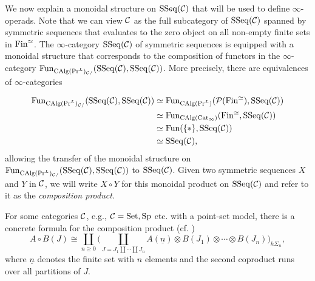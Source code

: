 %



We now explain a monoidal structure on $\operatorname{SSeq}({\mathcal{C}})$ that will be used to define $\infty$-operads. Note that we can view ${\mathcal{C}}$ as the full subcategory of $\operatorname{SSeq}({\mathcal{C}})$ spanned by symmetric sequences that evaluates to the zero object on all non-empty finite sets in $\operatorname{Fin}^{\simeq}$. 
The $\infty$-category $\operatorname{SSeq}({\mathcal{C}})$ of symmetric sequences is equipped with a monoidal structure that corresponds to the composition of functors in the $\infty$-category $\operatorname{Fun}_{\operatorname{CAlg}(\Pr^L)_{{\mathcal{C}}/}}(\operatorname{SSeq}({\mathcal{C}}),\operatorname{SSeq}({\mathcal{C}}))$. More precisely, there are equivalences of $\infty$-categories

\begin{align*}
    	\operatorname{Fun}_{\operatorname{CAlg}(\Pr^L)_{{\mathcal{C}}/}}(\operatorname{SSeq}({\mathcal{C}}),\operatorname{SSeq}({\mathcal{C}}))
	& \simeq 
\operatorname{Fun}_{\operatorname{CAlg}(\Pr^L)}({\mathcal{P}}(\operatorname{Fin}^{\simeq}),\operatorname{SSeq}({\mathcal{C}}))\\
& \simeq
\operatorname{Fun}_{\operatorname{CAlg}(\operatorname{Cat}_{\infty})}(\operatorname{Fin}^{\simeq},\operatorname{SSeq}({\mathcal{C}}))\\
& \simeq \operatorname{Fun}(\{*\}, \operatorname{SSeq}({\mathcal{C}}))\\
& \simeq \operatorname{SSeq}({\mathcal{C}}),
\end{align*}
allowing the transfer of the monoidal structure on $\operatorname{Fun}_{\operatorname{CAlg}(\Pr^L)_{{\mathcal{C}}/}}(\operatorname{SSeq}({\mathcal{C}}),\operatorname{SSeq}({\mathcal{C}}))$ to $\operatorname{SSeq}({\mathcal{C}})$.
Given two symmetric sequences $X$ and $Y$ in ${\mathcal{C}}$, we will write $X\circ Y$ for this monoidal product on $\operatorname{SSeq}({\mathcal{C}})$ and refer to it as the \emph{composition product}.


\begin{remark}
\label{formula for composition product}
For some categories ${\mathcal{C}}$, e.g.,  ${\mathcal{C}}=\operatorname{Set}, \operatorname{Sp}$ etc. with a point-set model, there is a concrete formula for the composition product (cf. \cite[Section 4.1.2.]{BrantnerPhD})
$$
A\circ B (J) \cong \coprod_{n\geq 0} \big(
\coprod_{J = J_1 \coprod \cdots \coprod J_n} A(\underline{n}) \otimes 
B(J_1)\otimes \cdots \otimes B(J_n)
\big)_{h\Sigma_n},
$$
where $\underline{n}$ denotes the finite set with $n$ elements and the second coproduct runs over all partitions of $J$. 
\end{remark}

